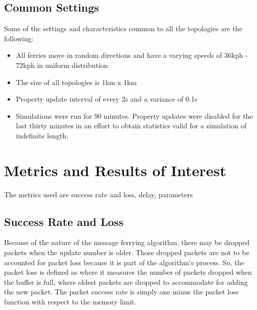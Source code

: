 \subsection{Common Settings}
\label{sec:commonsettings}
Some of the settings and characteristics common to all the topologies are the following:
\begin{itemize}
	\item All ferries move in random directions and have a varying speeds of 36kph - 72kph in uniform distribution 
	\item The size of all topologies is 1km x 1km
	\item Property update interval of every 2s and a variance of 0.1s
	\item Simulations were run for 90 minutes. Property updates were disabled for the last thirty minutes in an effort to obtain statistics valid for a simulation of indefinite length. 
\end{itemize}


\section{Metrics and Results of Interest }
\label{sec:metrics}

The metrics used are success rate and loss, delay, parameters  %

\subsection{Success Rate and Loss}
\label{sec:packetloss}
Because of the nature of the message ferrying algorithm, there may be dropped packets when the update number is older.
Those dropped packets are not to be accounted for packet loss because it is part of the algorithm`s process.
So, the packet loss is defined as where it measures the number of packets dropped when the buffer is full, where oldest packets are dropped to accommodate for adding the new packet.
The packet success rate is simply one minus the packet loss function with respect to the memory limit.


